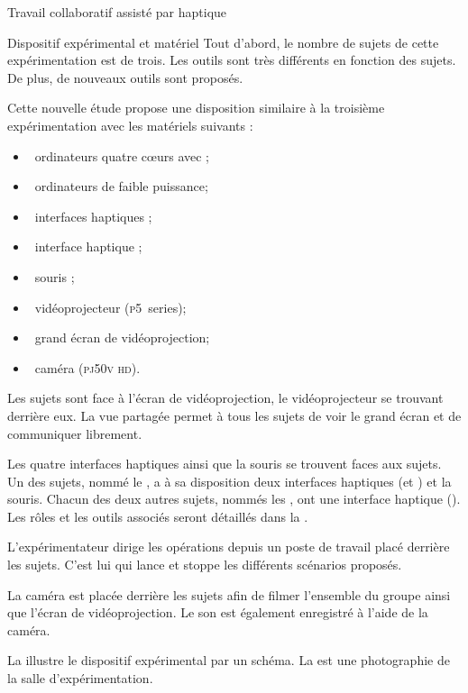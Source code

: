 \documentclass[myfrancais]{mythesis}
\begin{document}
\begin{mychapter}{Travail collaboratif assisté par haptique}
\begin{mysection}{Dispositif expérimental et matériel}
			Tout d'abord, le nombre de sujets de cette expérimentation est de trois.
			Les outils sont très différents en fonction des sujets.
			De plus, de nouveaux outils sont proposés.

			Cette nouvelle étude propose une disposition similaire à la troisième expérimentation  avec les matériels suivants :
			\begin{itemize}
				\item {}~ordinateurs quatre cœurs \myIntelCore avec ;
				\item {}~ordinateurs de faible puissance;
				\item {}~interfaces haptiques \myOmni;
				\item {}~interface haptique \myDesktop;
				\item {}~souris \myUSB;
				\item {}~vidéoprojecteur \myACER (\textsc{p5}~series);
				\item {}~grand écran de vidéoprojection;
				\item {}~caméra \mySony (\textsc{pj50v hd}).
			\end{itemize}

			Les sujets sont face à l'écran de vidéoprojection, le vidéoprojecteur se trouvant derrière eux.
			La vue partagée permet à tous les sujets de voir le grand écran et de communiquer librement.

			Les quatre interfaces haptiques ainsi que la souris se trouvent faces aux sujets.
			Un des sujets, nommé le , a à sa disposition deux interfaces haptiques (\myOmni et \myDesktop) et la souris.
			Chacun des deux autres sujets, nommés les , ont une interface haptique (\myOmni).
			Les rôles et les outils associés seront détaillés dans la .

			L'expérimentateur dirige les opérations depuis un poste de travail placé derrière les sujets.
			C'est lui qui lance et stoppe les différents scénarios proposés.

			La caméra est placée derrière les sujets afin de filmer l'ensemble du groupe ainsi que l'écran de vidéoprojection.
			Le son est également enregistré à l'aide de la caméra.

			La  illustre le dispositif expérimental par un schéma.
			La  est une photographie de la salle d'expérimentation.


\end{mysection}
\end{mychapter}
\end{document}
